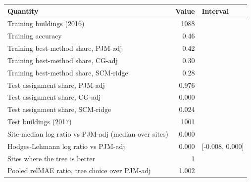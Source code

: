 \begin{tabular}{lrl}
\toprule
Quantity & Value & Interval \\
\midrule
Training buildings (2016) & 1088 &  \\ %
Training accuracy & 0.46 &  \\ %
Training best-method share, PJM-adj & 0.42 &  \\ %
Training best-method share, CG-adj & 0.30 &  \\ %
Training best-method share, SCM-ridge & 0.28 &  \\ %
Test assignment share, PJM-adj & 0.976 &  \\ %
Test assignment share, CG-adj & 0.000 &  \\ %
Test assignment share, SCM-ridge & 0.024 &  \\ %
Test buildings (2017) & 1001 &  \\ %
Site-median log ratio vs PJM-adj (median over sites) & 0.000 &  \\ %
Hodges-Lehmann log ratio vs PJM-adj & 0.000 & [-0.008, 0.000] \\ %
Sites where the tree is better & 1 &  \\ %
Pooled relMAE ratio, tree choice over PJM-adj & 1.002 &  \\ %
\bottomrule
\end{tabular}
